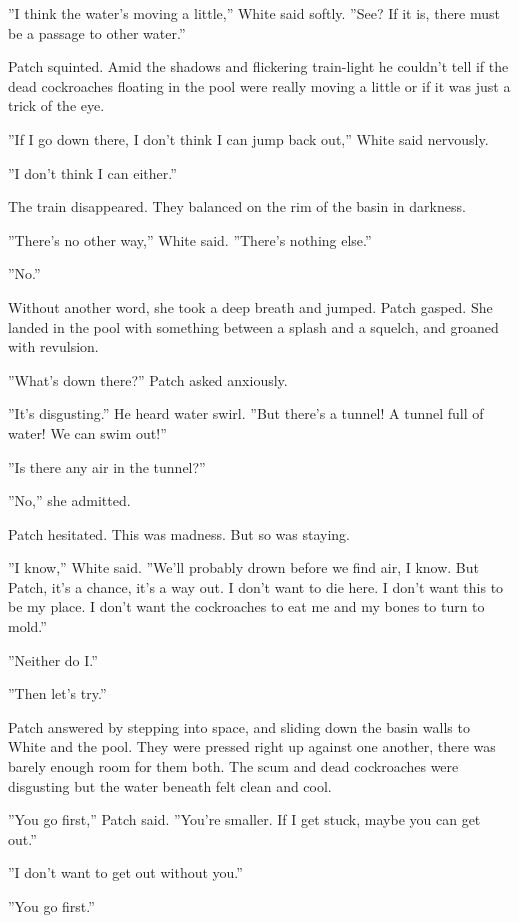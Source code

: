 \documentclass[12pt]{book}
\begin{document}
 ''I think the water's moving a little,'' White said softly. ''See? If it is, there must be a passage to other water.''\par
 Patch squinted. Amid the shadows and flickering train-light he couldn't tell if the dead cockroaches floating in the pool were really moving a little or if it was just a trick of the eye.\par
 ''If I go down there, I don't think I can jump back out,'' White said nervously.\par
 ''I don't think I can either.''\par
 The train disappeared. They balanced on the rim of the basin in darkness.\par
 ''There's no other way,'' White said. ''There's nothing else.''\par
 ''No.''\par
 Without another word, she took a deep breath and jumped. Patch gasped. She landed in the pool with something between a splash and a squelch, and groaned with revulsion.\par
 ''What's down there?'' Patch asked anxiously.\par
 ''It's disgusting.'' He heard water swirl. ''But there's a tunnel! A tunnel full of water! We can swim out!''\par
 ''Is there any air in the tunnel?''\par
 ''No,'' she admitted.\par
 Patch hesitated. This was madness. But so was staying.\par
 ''I know,'' White said. ''We'll probably drown before we find air, I know. But Patch, it's a chance, it's a way out. I don't want to die here. I don't want this to be my place. I don't want the cockroaches to eat me and my bones to turn to mold.''\par
 ''Neither do I.''\par
 ''Then let's try.''\par
 Patch answered by stepping into space, and sliding down the basin walls to White and the pool. They were pressed right up against one another, there was barely enough room for them both. The scum and dead cockroaches were disgusting %
 but the water beneath felt clean and cool.\par
 ''You go first,'' Patch said. ''You're smaller. If I get stuck, maybe you can get out.''\par
 ''I don't want to get out without you.''\par
 ''You go first.''\par
\end{document}
